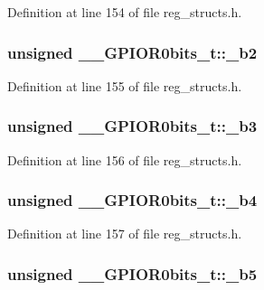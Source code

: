 Definition at line 154 of file reg\+\_\+structs.\+h.

\hypertarget{union_____g_p_i_o_r0bits__t_a6984b5721a28117a67937fe49c856ad8}{
\subsubsection[{\+\_\+b2}]{\setlength{\rightskip}{0pt plus 5cm}unsigned \+\_\+\+\_\+\+G\+P\+I\+O\+R0bits\+\_\+t\+::\+\_\+b2}}\label{union_____g_p_i_o_r0bits__t_a6984b5721a28117a67937fe49c856ad8}


Definition at line 155 of file reg\+\_\+structs.\+h.

\hypertarget{union_____g_p_i_o_r0bits__t_ad98e3c6f52dae31936f3a4dd33949012}{
\subsubsection[{\+\_\+b3}]{\setlength{\rightskip}{0pt plus 5cm}unsigned \+\_\+\+\_\+\+G\+P\+I\+O\+R0bits\+\_\+t\+::\+\_\+b3}}\label{union_____g_p_i_o_r0bits__t_ad98e3c6f52dae31936f3a4dd33949012}


Definition at line 156 of file reg\+\_\+structs.\+h.

\hypertarget{union_____g_p_i_o_r0bits__t_af2305a9c081f35a684b9ac3130037d6e}{
\subsubsection[{\+\_\+b4}]{\setlength{\rightskip}{0pt plus 5cm}unsigned \+\_\+\+\_\+\+G\+P\+I\+O\+R0bits\+\_\+t\+::\+\_\+b4}}\label{union_____g_p_i_o_r0bits__t_af2305a9c081f35a684b9ac3130037d6e}


Definition at line 157 of file reg\+\_\+structs.\+h.

\hypertarget{union_____g_p_i_o_r0bits__t_a4582d599ff06d6e5eb9235b7f0553526}{
\subsubsection[{\+\_\+b5}]{\setlength{\rightskip}{0pt plus 5cm}unsigned \+\_\+\+\_\+\+G\+P\+I\+O\+R0bits\+\_\+t\+::\+\_\+b5}}\label{union_____g_p_i_o_r0bits__t_a4582d599ff06d6e5eb9235b7f0553526}


